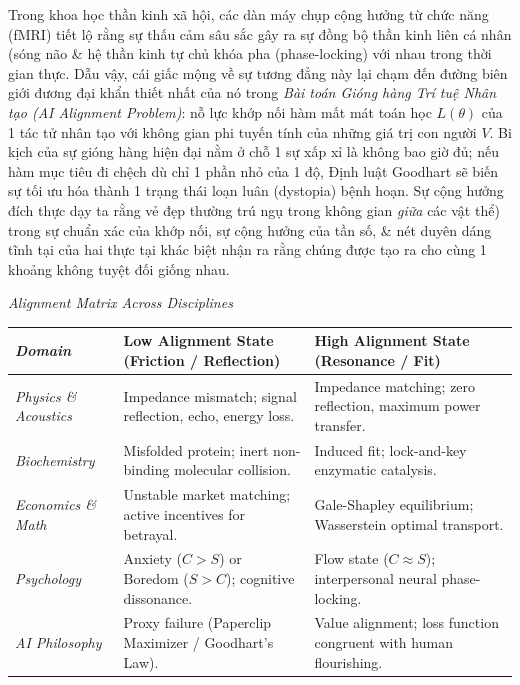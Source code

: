 \documentclass[11pt]{article}
\begin{document}
Trong khoa học thần kinh xã hội, các dàn máy chụp cộng hưởng từ chức năng (fMRI) tiết lộ rằng sự thấu cảm sâu sắc gây ra sự đồng bộ thần kinh liên cá nhân (sóng não \& hệ thần kinh tự chủ khóa pha (phase-locking) với nhau trong thời gian thực. Dẫu vậy, cái giấc mộng về sự tương đẳng này lại chạm đến đường biên giới đương đại khẩn thiết nhất của nó trong \emph{Bài toán Gióng hàng Trí tuệ Nhân tạo (AI Alignment Problem)}: nỗ lực khớp nối hàm mất mát toán học $L(\theta)$ của 1 tác tử nhân tạo với không gian phi tuyến tính của những giá trị con người $V$. Bi kịch của sự gióng hàng hiện đại nằm ở chỗ 1 sự xấp xỉ là không bao giờ đủ; nếu hàm mục tiêu đi chệch dù chỉ 1 phần nhỏ của 1 độ, Định luật Goodhart sẽ biến sự tối ưu hóa thành 1 trạng thái loạn luân (dystopia) bệnh hoạn. Sự cộng hưởng đích thực dạy ta rằng vẻ đẹp thường trú ngụ trong không gian \textit{giữa} các vật thể) trong sự chuẩn xác của khớp nối, sự cộng hưởng của tần số, \& nét duyên dáng tĩnh tại của hai thực tại khác biệt nhận ra rằng chúng được tạo ra cho cùng 1 khoảng không tuyệt đối giống nhau.

\emph{Alignment Matrix Across Disciplines}
\begin{table}[H]
\centering
\begin{tabular}{@{}p{3cm}p{6cm}p{6cm}@{}}
\toprule
\emph{Domain} & \textbf{Low Alignment State (Friction / Reflection)} & \textbf{High Alignment State (Resonance / Fit)} \\
\midrule
\emph{Physics \& Acoustics} & Impedance mismatch; signal reflection, echo, energy loss. & Impedance matching; zero reflection, maximum power transfer. \\

\emph{Biochemistry} & Misfolded protein; inert non-binding molecular collision. & Induced fit; lock-and-key enzymatic catalysis. \\

\emph{Economics \& Math} & Unstable market matching; active incentives for betrayal. & Gale-Shapley equilibrium; Wasserstein optimal transport. \\

\emph{Psychology} & Anxiety ($C > S$) or Boredom ($S > C$); cognitive dissonance. & Flow state ($C \approx S$); interpersonal neural phase-locking. \\

\emph{AI Philosophy} & Proxy failure (Paperclip Maximizer / Goodhart's Law). & Value alignment; loss function congruent with human flourishing. \\
\bottomrule
\end{tabular}
\end{table}
\end{document}

